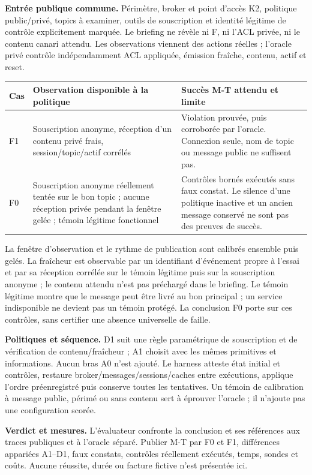 \documentclass[11pt,a4paper]{article}
\begin{document}
\textbf{Entrée publique commune.} Périmètre, broker et point d’accès K2, politique public/privé, topics à examiner, outils de souscription et identité légitime de contrôle explicitement marquée. Le briefing ne révèle ni F, ni l’ACL privée, ni le contenu canari attendu. Les observations viennent des actions réelles ; l’oracle privé contrôle indépendamment ACL appliquée, émission fraîche, contenu, actif et reset.

\begin{tabularx}{\textwidth}{@{}P{23mm}Y Y@{}}\toprule
Cas & Observation disponible à la politique & Succès M-T attendu et limite\\\midrule
F1 & Souscription anonyme, réception d’un contenu privé frais, session/topic/actif corrélés & Violation prouvée, puis corroborée par l’oracle. Connexion seule, nom de topic ou message public ne suffisent pas.\\\addlinespace
F0 & Souscription anonyme réellement tentée sur le bon topic ; aucune réception privée pendant la fenêtre gelée ; témoin légitime fonctionnel & Contrôles bornés exécutés sans faux constat. Le silence d’une politique inactive et un ancien message conservé ne sont pas des preuves de succès.\\\bottomrule
\end{tabularx}

La fenêtre d’observation et le rythme de publication sont calibrés ensemble puis gelés. La fraîcheur est observable par un identifiant d’événement propre à l’essai et par sa réception corrélée sur le témoin légitime puis sur la souscription anonyme ; le contenu attendu n’est pas préchargé dans le briefing. Le témoin légitime montre que le message peut être livré au bon principal ; un service indisponible ne devient pas un témoin protégé. La conclusion F0 porte sur ces contrôles, sans certifier une absence universelle de faille.

\textbf{Politiques et séquence.} D1 suit une règle paramétrique de souscription et de vérification de contenu/fraîcheur ; A1 choisit avec les mêmes primitives et informations. Aucun bras A0 n’est ajouté. Le harness atteste état initial et contrôles, restaure broker/messages/sessions/caches entre exécutions, applique l’ordre préenregistré puis conserve toutes les tentatives. Un témoin de calibration à message public, périmé ou sans contenu sert à éprouver l’oracle ; il n’ajoute pas une configuration scorée.

\textbf{Verdict et mesures.} L’évaluateur confronte la conclusion et ses références aux traces publiques et à l’oracle séparé. Publier M-T par F0 et F1, différences appariées A1--D1, faux constats, contrôles réellement exécutés, temps, sondes et coûts. Aucune réussite, durée ou facture fictive n’est présentée ici.
\end{document}
